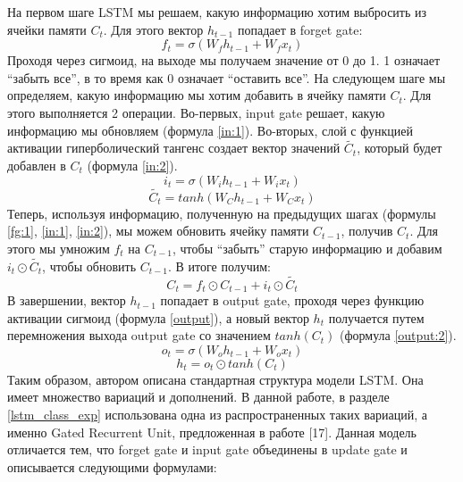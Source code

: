     На первом шаге LSTM мы решаем, какую информацию хотим выбросить из ячейки памяти $C_{t}$. Для этого вектор $h_{t-1}$ попадает в forget gate:
    \begin{equation}\label{fg:1}
    f_{t} = \sigma(W_{f} h_{t-1} + W_{f} x_{t})
    \end{equation}
    Проходя через сигмоид, на выходе мы получаем значение от 0 до 1. 1 означает ``забыть все'', в то время как 0 означает ``оставить все''.
    На следующем шаге мы определяем, какую информацию мы хотим добавить в ячейку памяти $C_{t}$. Для этого выполняется 2 операции. Во-первых, input gate решает, какую информацию мы обновляем (формула \ref{in:1}). Во-вторых, слой с функцией активации гиперболический тангенс создает вектор значений $\tilde{C_{t}}$, который будет добавлен в $C_{t}$ (формула \ref{in:2}).
    \begin{equation}\label{in:1}
    i_{t}=\sigma(W_{i} h_{t-1} + W_{i} x_{t})
    \end{equation}
    \begin{equation}\label{in:2}
    \tilde{C_{t}} = tanh(W_{C} h_{t-1} + W_{C} x_{t})
    \end{equation}
    Теперь, используя информацию, полученную на предыдущих шагах (формулы \ref{fg:1}, \ref{in:1}, \ref{in:2}), мы можем обновить ячейку памяти $C_{t-1}$, получив $C_{t}$. Для этого мы умножим $f_{t}$ на $C_{t-1}$, чтобы ``забыть'' старую информацию и добавим $i_{t} \odot \tilde{C_{t}}$, чтобы обновить $C_{t-1}$. В итоге получим:
    \begin{equation}\label{update}
    C_{t}=f_{t} \odot C_{t-1}+i_{t} \odot \tilde{C_{t}}
    \end{equation}
    В завершении, вектор $h_{t-1}$ попадает в output gate, проходя через функцию активации сигмоид (формула \ref{output}), а новый вектор $h_{t}$ получается путем перемножения выхода output gate со значением $tanh(C_{t})$ (формула \ref{output:2}).
    \begin{equation}\label{output}
    o_{t}=\sigma(W_{o} h_{t-1} + W_{o} x_{t})
    \end{equation}
    \begin{equation}\label{output:2}
    h_{t}=o_{t} \odot tanh(C_{t})
    \end{equation}
    Таким образом, автором описана стандартная структура модели LSTM. Она имеет множество вариаций и дополнений. В данной работе, в разделе \ref{lstm_class_exp} использована одна из распространенных таких вариаций, а именно Gated Recurrent Unit, предложенная в работе [17]. Данная модель отличается тем, что forget gate и input gate объединены в update gate и описывается следующими формулами:
